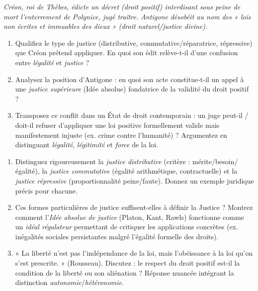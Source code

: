 \documentclass[11pt]{article}
\begin{document}
\begin{exercice}
    \textit{Créon, roi de Thèbes, édicte un décret (droit positif) interdisant sous peine de mort l'enterrement de Polynice, jugé traître. Antigone désobéit au nom des « lois non écrites et immuables des dieux » (droit naturel/justice divine).}
    \begin{enumerate}
        \item Qualifiez le type de justice (distributive, commutative/réparatrice, répressive) que Créon prétend appliquer. En quoi son édit relève-t-il d'une confusion entre \textit{légalité} et \textit{justice} ?
        \item Analysez la position d'Antigone : en quoi son acte constitue-t-il un appel à une \textit{justice supérieure} (Idée absolue) fondatrice de la validité du droit positif ?
        \item Transposez ce conflit dans un État de droit contemporain : un juge peut-il / doit-il refuser d'appliquer une loi positive formellement valide mais manifestement injuste (ex. crime contre l'humanité) ? Argumentez en distinguant \textit{légalité}, \textit{légitimité} et \textit{force} de la loi.
    \end{enumerate}
\end{exercice}

\begin{exercice}
    \begin{enumerate}
        \item Distinguez rigoureusement la \textit{justice distributive} (critère : mérite/besoin/égalité), la \textit{justice commutative} (égalité arithmétique, contractuelle) et la \textit{justice répressive} (proportionnalité peine/faute). Donnez un exemple juridique précis pour chacune.
        \item Ces formes particulières de justice suffisent-elles à définir la Justice ? Montrez comment l'\textit{Idée absolue de justice} (Platon, Kant, Rawls) fonctionne comme un \textit{idéal régulateur} permettant de critiquer les applications concrètes (ex. inégalités sociales persistantes malgré l'égalité formelle des droits).
        \item « La liberté n'est pas l'indépendance de la loi, mais l'obéissance à la loi qu'on s'est prescrite. » (Rousseau). Discutez : le respect du droit positif est-il la condition de la liberté ou son aliénation ? Réponse nuancée intégrant la distinction \textit{autonomie}/\textit{hétéronomie}.
    \end{enumerate}
\end{exercice}
\end{document}
